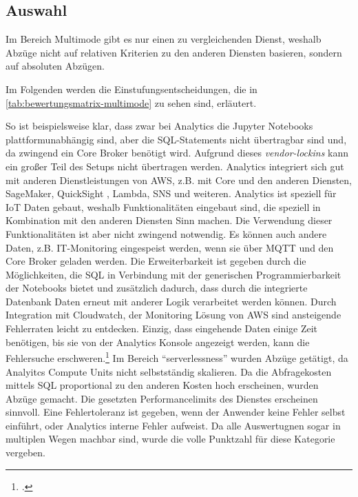 \subsection{Auswahl}
Im Bereich Multimode gibt es nur einen zu vergleichenden Dienst, weshalb Abzüge nicht auf relativen Kriterien zu den anderen Diensten basieren, sondern auf absoluten Abzügen.

Im Folgenden werden die Einstufungsentscheidungen, die in \autoref{tab:bewertungsmatrix-multimode} zu sehen sind, erläutert.

So ist beispielsweise klar, dass zwar bei \AWSIOT{} Analytics die Jupyter Notebooks plattformunabhängig sind, aber die \ac{SQL}-Statements nicht übertragbar sind und, da zwingend ein \AWSIOT{} Core Broker benötigt wird. Aufgrund dieses \textit{vendor-lockins} kann ein großer Teil des Setups nicht übertragen werden.
\AWSIOT{} Analytics integriert sich gut mit anderen Dienstleistungen von AWS, z.B. mit \AWSIOT{} Core und den anderen \AWSIOT{} Diensten, SageMaker, QuickSight , Lambda, \ac{SNS} und weiteren.
\AWSIOT{} Analytics ist speziell für \ac{IoT} Daten gebaut, weshalb Funktionalitäten eingebaut sind, die speziell in Kombination mit den anderen \AWSIOT{} Diensten Sinn machen. Die Verwendung dieser Funktionalitäten ist aber nicht zwingend notwendig. Es können auch andere Daten, z.B. IT-Monitoring eingespeist werden, wenn sie über \ac{MQTT} und den \AWSIOT{} Core Broker geladen werden.
Die Erweiterbarkeit ist gegeben durch die Möglichkeiten, die \ac{SQL} in Verbindung mit der generischen Programmierbarkeit der Notebooks bietet und zusätzlich dadurch, dass durch die integrierte Datenbank Daten erneut mit anderer Logik verarbeitet werden können.
Durch Integration mit Cloudwatch, der Monitoring Lösung von \ac{AWS} sind ansteigende Fehlerraten leicht zu entdecken. Einzig, dass eingehende Daten einige Zeit benötigen, bis sie von der \AWSIOT{} Analytics Konsole angezeigt werden, kann die Fehlersuche erschweren.\footcite[Vgl.][]{AmazonWebServicesInc..o.J.aw}
Im Bereich \enquote{serverlessness} wurden Abzüge getätigt, da Analyitcs Compute Units nicht selbstständig skalieren.
Da die Abfragekosten mittels \ac{SQL} proportional zu den anderen Kosten hoch erscheinen, wurden Abzüge gemacht.
Die gesetzten Performancelimits des Dienstes erscheinen sinnvoll. Eine Fehlertoleranz ist gegeben, wenn der Anwender keine Fehler selbst einführt, oder \AWSIOT{} Analytics interne Fehler aufweist. Da alle Auswertugnen sogar in multiplen Wegen machbar sind, wurde die volle Punktzahl für diese Kategorie vergeben.


